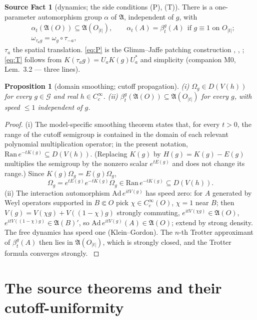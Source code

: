 \documentclass[11pt,a4paper]{article}
\theoremstyle{plain}
\newtheorem{proposition}[theorem]{Proposition}
\theoremstyle{definition}
\newtheorem{srcfact}[theorem]{Source Fact}
\newcommand{\A}{\mathfrak{A}}
\newcommand{\G}{\mathcal{G}}
\newcommand{\Om}{\Omega}
\begin{document}
\begin{srcfact}[dynamics; the side conditions (P), (T)]\label{fact:PT}
There is a one-parameter automorphism group $\alpha$ of $\A$, independent of $g$, with
\begin{align}
  &\alpha_t(\A(O))\subseteq\A(O_{|t|}),\qquad
  \alpha_t(A)=\beta^g_t(A)\ \ \text{if } g\equiv1 \text{ on } O_{|t|};
  \tag{P}\label{eq:P}\\
  &\omega_{\tau_ag}=\omega_g\circ\tau_{-a},
  \tag{T}\label{eq:T}
\end{align}
$\tau_a$ the spatial translation. \eqref{eq:P} is the Glimm--Jaffe patching construction
\cite[\S III]{GJ1}, \cite[\S3.5--3.6]{GJ2}, \cite[\S4.1]{GJExp}; \eqref{eq:T} follows from
$K(\tau_ag)=U_aK(g)U_a^*$ and simplicity (companion M0, Lem.~3.2 --- three lines).
\end{srcfact}

\begin{proposition}[domain smoothing; cutoff propagation]\label{prop:standard-main}
\emph{(i)} $\Om_g\in D(V(h))$ for every $g\in\G$ and real $h\in C_c^\infty$.
\emph{(ii)} $\beta^g_t(\A(O))\subseteq\A(O_{|t|})$ for every $g$, with speed $\le1$ independent
of $g$.
\end{proposition}

\begin{proof}
(i) The model-specific smoothing theorem \cite[Ch.~7, Thm.~7.4]{GJExp} states that, for every
$t>0$, the range of the cutoff semigroup is contained in the domain of each relevant polynomial
multiplication operator; in the present notation,
$\mathrm{Ran}\,e^{-tK(g)}\subseteq D(V(h))$. (Replacing $K(g)$ by $H(g)=K(g)-E(g)$ multiplies
the semigroup by the nonzero scalar $e^{tE(g)}$ and does not change its range.) Since
$K(g)\Om_g=E(g)\Om_g$,
\[
  \Om_g=e^{tE(g)}e^{-tK(g)}\Om_g\in\mathrm{Ran}\,e^{-tK(g)}\subseteq D(V(h)).
\]
(ii) The interaction automorphism $\mathrm{Ad}\,e^{itV(g)}$ has speed zero: for $A$ generated by
Weyl operators supported in $B\Subset O$ pick $\chi\in C_c^\infty(O)$, $\chi=1$ near $B$; then
$V(g)=V(\chi g)+V((1-\chi)g)$ strongly commuting, $e^{itV(\chi g)}\in\A(O)$,
$e^{itV((1-\chi)g)}\in\A(B)'$, so $\mathrm{Ad}\,e^{itV(g)}(A)\in\A(O)$; extend by strong density.
The free dynamics has speed one (Klein--Gordon). The $n$-th Trotter approximant of $\beta^g_t(A)$
then lies in $\A(O_{|t|})$, which is strongly closed, and the Trotter formula converges
strongly. \cite[Ch.~4]{GJExp}
\end{proof}

\section{The source theorems and their cutoff-uniformity}\label{sec:sources}
\end{document}
